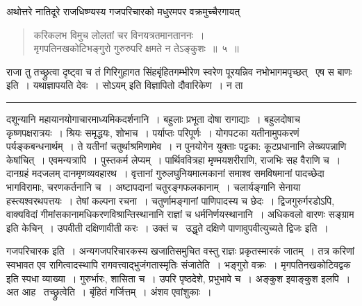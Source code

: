 \documentclass[11pt, openany]{book}
\begin{document}
अथोत्तरे नातिदूरे राजधिष्ण्यस्य गजपरिचारको मधुरमपर वक्रमुच्चैरगायत् \textendash\ 

\vspace{-5mm}
\begin{quote}
{\ha करिकलभ विमुच लोलतां चर विनयत्रतमानताननः~।\\
मृगपतिनखकोटिभङ्गुरो गुरुरुपरि क्षमते न तेऽङ्कुशः~॥~५~॥}
\end{quote}

\vspace{-5mm}
राजा तु तच्छ्रुत्वा दृष्ट्वा च तं गिरिगुहागत सिंहबृंहितगम्भीरेण स्वरेण पूरयन्निव नभोभागमपृच्छत् \textendash\ {\haq एष स बाणः} इति~। {\haq यथाज्ञापयति देवः~। सोऽयम्} इति विज्ञापितो दौवारिकेण~। न ता

\vspace{2mm}
\hrule

\noindent
{\s दशून्यानि महायानयोगाचारमाध्यमिकदर्शनानि~। बहुलाः प्रभूता दोषा रागाद्याः~। बहुलदोषाच कृष्णपक्षरात्रयः~। श्रियः समृद्धयः, शोभाच~। पर्याप्तः परिपूर्णः~। योगपटका यतीनामुपकरणं पर्यङ्कबन्धनार्थम्~। ते यतीनां चतुर्थाश्रमिणामेव~। न पुनयोगेन युक्ताः पट्टका: कूटप्रधानानि लेख्यपन्नाणि केषांचित्~। एवमन्यत्रापि~। पुस्तकर्म लेप्यम्~। पार्थिववित्रहा मृण्मयशरीराणि, राजभिः सह वैराणि च~। दानग्रहं मदजलम् दानमृणव्यवहारथ~। वृत्तानां गुरुलघुनियमात्मकानां समाश्व समविषमानां पादच्छेदा भागविरामाः, चरणकर्तनानि च~। अष्टापदानां चतुरङ्गफलकानाम्~। {\qt चलार्यङ्गानि सेनाया हस्त्यश्वरथपत्तयः}~। तेषां कल्पना रचना~। चतुर्णामङ्गानां पाणिपादस्य च छेदः~। द्विजगुरुर्गरडोऽपि, वाक्यविदां गीमांसकानामधिकरणविश्रान्तिस्थानानि राज्ञां च धर्मनिर्णयस्थानानि~। अधिकवलो वारणः सङ्ग्राम इति केचिन्~। उपवीती दक्षिणावीती करः~। उक्तं च \textendash\ {\qt उद्धृते दक्षिणे पाणावुपवीत्युच्यते द्विजः} इति~।

{\qtt गजपरिचारक इति}~। अन्यगजपरिचारकस्य खजातिसमुचित वस्तु राज्ञः प्रकृतस्मारकं जातम्~। तत्र करिणां स्वभावत एव रागित्वादस्थापि रागवत्त्वाद्भुजंगतास्मृतिः संजातेति~। भङ्गुरो वक्रः~। मृगपतिनखकोटिवद्वक इति स्पधा व्याख्या~। गुरुर्भारः, शासिता च~। उपरि पृष्ठदेशे, प्रभुभावे च~। अङ्कुश इवाङ्कुश इलपि~। अत आह \textendash\ {\qtt तच्छ्रुत्वेति}~। बृंहितं गर्जित्तम्~। अंशव एवांशुकाः~।}

\newpage
\end{document}
